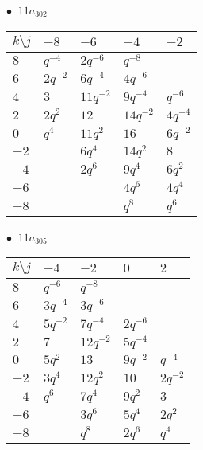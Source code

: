 \begin{minipage}{\linewidth}
$\bullet\ $ $11a_{302}$ \vspace{0.5em} \\
\begin{tabular}{l|llll}
$k \setminus j$ & $-8$ & $-6$ & $-4$ & $-2$ \\
\hline
$8$ & $q^{-4}$ & $2q^{-6}$ & $q^{-8}$ &  \\
$6$ & $2q^{-2}$ & $6q^{-4}$ & $4q^{-6}$ &  \\
$4$ & $3$ & $11q^{-2}$ & $9q^{-4}$ & $q^{-6}$ \\
$2$ & $2q^{2}$ & $12$ & $14q^{-2}$ & $4q^{-4}$ \\
$0$ & $q^{4}$ & $11q^{2}$ & $16$ & $6q^{-2}$ \\
$-2$ &  & $6q^{4}$ & $14q^{2}$ & $8$ \\
$-4$ &  & $2q^{6}$ & $9q^{4}$ & $6q^{2}$ \\
$-6$ &  &  & $4q^{6}$ & $4q^{4}$ \\
$-8$ &  &  & $q^{8}$ & $q^{6}$ \\
\end{tabular}
\vspace{2em}
\end{minipage}
%
\begin{minipage}{\linewidth}
$\bullet\ $ $11a_{305}$ \vspace{0.5em} \\
\begin{tabular}{l|llll}
$k \setminus j$ & $-4$ & $-2$ & $0$ & $2$ \\
\hline
$8$ & $q^{-6}$ & $q^{-8}$ &  &  \\
$6$ & $3q^{-4}$ & $3q^{-6}$ &  &  \\
$4$ & $5q^{-2}$ & $7q^{-4}$ & $2q^{-6}$ &  \\
$2$ & $7$ & $12q^{-2}$ & $5q^{-4}$ &  \\
$0$ & $5q^{2}$ & $13$ & $9q^{-2}$ & $q^{-4}$ \\
$-2$ & $3q^{4}$ & $12q^{2}$ & $10$ & $2q^{-2}$ \\
$-4$ & $q^{6}$ & $7q^{4}$ & $9q^{2}$ & $3$ \\
$-6$ &  & $3q^{6}$ & $5q^{4}$ & $2q^{2}$ \\
$-8$ &  & $q^{8}$ & $2q^{6}$ & $q^{4}$ \\
\end{tabular}
\vspace{2em}
\end{minipage}
%
